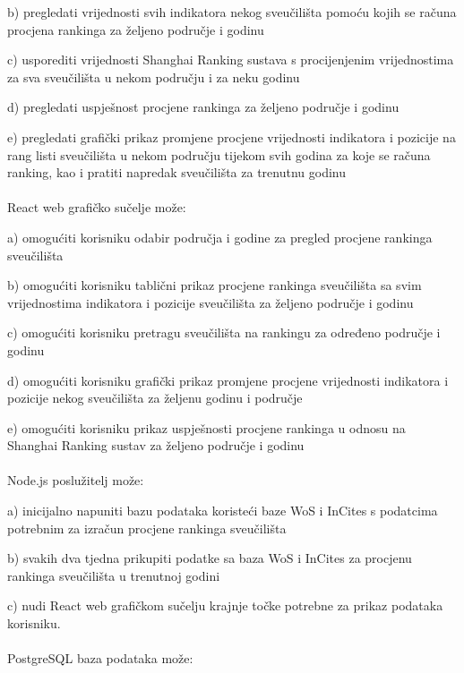 \documentclass[times, utf8, zavrsni]{fer}
\begin{document}
b) pregledati vrijednosti svih indikatora nekog sveučilišta pomoću kojih se računa procjena rankinga za željeno područje i godinu

c) usporediti vrijednosti Shanghai Ranking sustava s procijenjenim vrijednostima za sva sveučilišta u nekom području i za neku godinu

d) pregledati uspješnost procjene rankinga za željeno područje i godinu

e) pregledati grafički prikaz promjene procjene vrijednosti indikatora i pozicije na rang listi sveučilišta u nekom području tijekom svih godina 
za koje se računa ranking, kao i pratiti napredak sveučilišta za trenutnu godinu
\\
\\React web grafičko sučelje može:

a) omogućiti korisniku odabir područja i godine za pregled procjene rankinga sveučilišta

b) omogućiti korisniku tablični prikaz procjene rankinga sveučilišta sa svim vrijednostima indikatora i pozicije sveučilišta za željeno područje i godinu

c) omogućiti korisniku pretragu sveučilišta na rankingu za određeno područje i godinu

d) omogućiti korisniku grafički prikaz  promjene procjene vrijednosti indikatora i pozicije nekog sveučilišta za željenu godinu i područje

e) omogućiti korisniku prikaz uspješnosti procjene rankinga u odnosu na Shanghai Ranking sustav za željeno područje i godinu
\\
\\Node.js poslužitelj može:

a) inicijalno napuniti bazu podataka koristeći baze WoS i InCites s podatcima potrebnim za izračun procjene rankinga sveučilišta

b) svakih dva tjedna prikupiti podatke sa baza WoS i InCites za procjenu rankinga sveučilišta u trenutnoj godini

c) nudi React web grafičkom sučelju krajnje točke potrebne za prikaz podataka korisniku.
\\
\\PostgreSQL baza podataka može:
\end{document}
